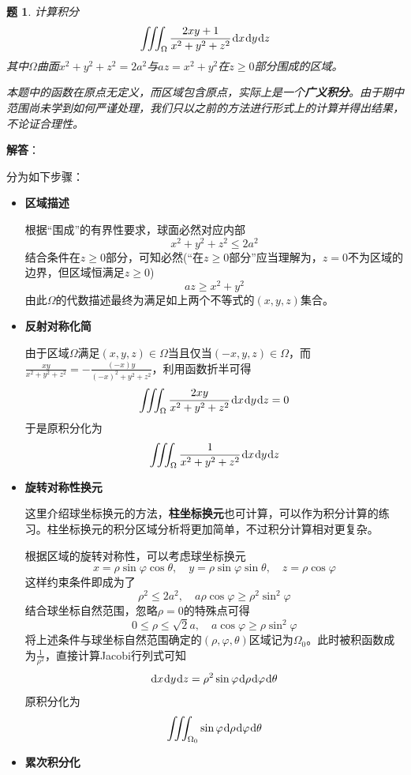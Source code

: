 \documentclass[a4paper,UTF8,fontset=windows,AutoFakeBold]{ctexart}
\newcommand*{\dr}{\hspace{0.07em}\mathrm{d}}
\newcommand*{\note}{\noindent *}
\theoremstyle{ex}
\newtheorem{exercise}{题}
\newcommand{\sol}[1]{{\vspace{5pt}\kaishu\noindent\textbf{解答}：\vspace{-3pt}
\begin{compactitem}
    \item[] #1
\end{compactitem}
}}
\begin{document}
\begin{framed}
\begin{exercise}
    计算积分
    $$\iiint_\Omega\frac{2xy+1}{x^2+y^2+z^2}\dr x\dr y\dr z$$
    其中$\Omega$曲面$x^2+y^2+z^2=2a^2$与$az=x^2+y^2$在$z\ge0$部分围成的区域。

    \note 本题中的函数在原点无定义，而区域包含原点，实际上是一个\textbf{广义积分}。由于期中范围尚未学到如何严谨处理，我们只以之前的方法进行形式上的计算并得出结果，不论证合理性。
\end{exercise}
\sol{
    分为如下步骤：
    \begin{itemize}
        \item \textbf{区域描述}

        根据``围成''的有界性要求，球面必然对应内部
        $$x^2+y^2+z^2\le 2a^2$$
        结合条件在$z\ge0$部分，可知必然(``在$z\ge0$部分''应当理解为，$z=0$不为区域的边界，但区域恒满足$z\ge0$)
        $$az\ge x^2+y^2$$
        由此$\Omega$的代数描述最终为满足如上两个不等式的$(x,y,z)$集合。

        \item \textbf{反射对称化简}
        
        由于区域$\Omega$满足$(x,y,z)\in\Omega$当且仅当$(-x,y,z)\in\Omega$，而$\frac{xy}{x^2+y^2+z^2}=-\frac{(-x)y}{(-x)^2+y^2+z^2}$，利用函数折半可得
        $$\iiint_\Omega\frac{2xy}{x^2+y^2+z^2}\dr x\dr y\dr z=0$$
        于是原积分化为
        $$\iiint_\Omega\frac{1}{x^2+y^2+z^2}\dr x\dr y\dr z$$

        \item \textbf{旋转对称性换元}
        
        \note 这里介绍球坐标换元的方法，\textbf{柱坐标换元}也可计算，可以作为积分计算的练习。柱坐标换元的积分区域分析将更加简单，不过积分计算相对更复杂。
        
        根据区域的旋转对称性，可以考虑球坐标换元
        $$x=\rho\sin\varphi\cos\theta,\quad y=\rho\sin\varphi\sin\theta,\quad z=\rho\cos\varphi$$
        这样约束条件即成为了
        $$\rho^2\le 2a^2,\quad a\rho\cos\varphi\ge\rho^2\sin^2\varphi$$
        结合球坐标自然范围，忽略$\rho=0$的特殊点可得
        $$0\le\rho\le\sqrt2a,\quad a\cos\varphi\ge\rho\sin^2\varphi$$        
        将上述条件与球坐标自然范围确定的$(\rho,\varphi,\theta)$区域记为$\Omega_0$。此时被积函数成为$\frac{1}{\rho^2}$，直接计算Jacobi行列式可知
        $$\dr x\dr y\dr z=\rho^2\sin\varphi\dr\rho\dr\varphi\dr\theta$$
        原积分化为
        $$\iiint_{\Omega_0}\sin\varphi\dr\rho\dr\varphi\dr\theta$$

        \item \textbf{累次积分化}
        

\end{itemize}}
\end{framed}
\end{document}
